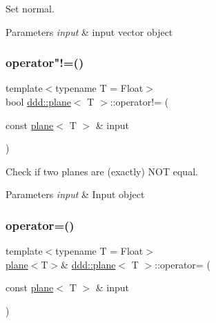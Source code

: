 Set normal. 


\begin{DoxyParams}{Parameters}
{\em input} & input vector object \\
\hline
\end{DoxyParams}
\mbox{\label{classddd_1_1plane_a0daa9c3444894627380a1174d3721ca9}} 
\subsubsection{\texorpdfstring{operator"!=()}{operator!=()}}
{\footnotesize\ttfamily template$<$typename T = Float$>$ \\
bool \hyperlink{classddd_1_1plane}{ddd\+::plane}$<$ T $>$\+::operator!= (\begin{DoxyParamCaption}\item[{const \hyperlink{classddd_1_1plane}{plane}$<$ T $>$ \&}]{input }\end{DoxyParamCaption})\hspace{0.3cm}{\ttfamily [inline]}}



Check if two planes are (exactly) N\+OT equal. 


\begin{DoxyParams}{Parameters}
{\em input} & Input object \\
\hline
\end{DoxyParams}
\mbox{\label{classddd_1_1plane_a4a32afd2bc44926aceccef5de9798945}} 
\subsubsection{\texorpdfstring{operator=()}{operator=()}}
{\footnotesize\ttfamily template$<$typename T = Float$>$ \\
\hyperlink{classddd_1_1plane}{plane}$<$T$>$\& \hyperlink{classddd_1_1plane}{ddd\+::plane}$<$ T $>$\+::operator= (\begin{DoxyParamCaption}\item[{const \hyperlink{classddd_1_1plane}{plane}$<$ T $>$ \&}]{input }\end{DoxyParamCaption})\hspace{0.3cm}{\ttfamily [inline]}}



